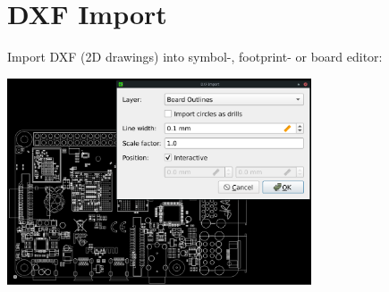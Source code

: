 \section{DXF Import}

\begin{frame}{\secname}

  Import DXF (2D drawings) into symbol-, footprint- or board editor:

  \begin{center}
    \includegraphics[width=9cm]{images/dxf_import.png}
  \end{center}

\end{frame}
